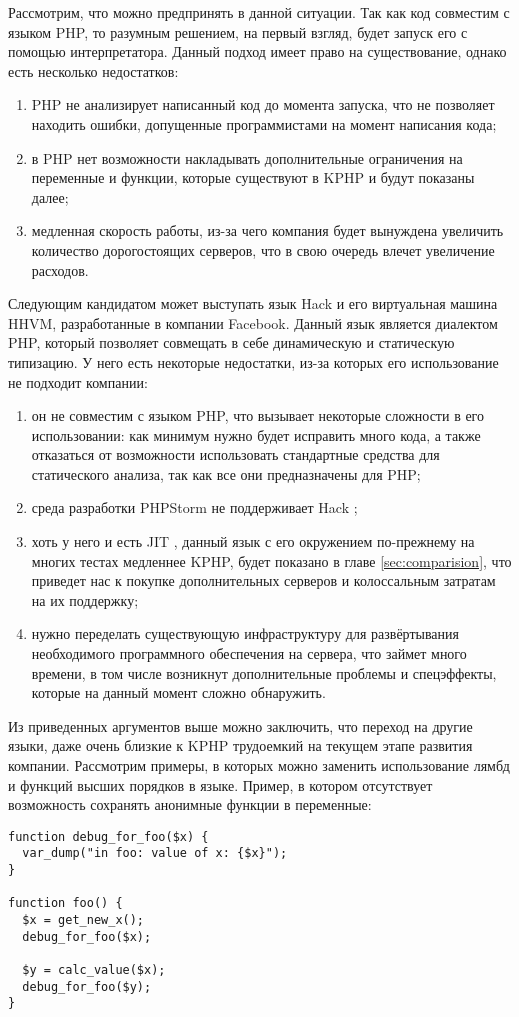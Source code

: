 Рассмотрим, что можно предпринять в данной ситуации. 
Так как код совместим с языком PHP, то разумным решением, на первый взгляд, будет запуск его с помощью интерпретатора.
Данный подход имеет право на существование, однако есть несколько недостатков:
\begin{enumerate}
  \item PHP не анализирует написанный код до момента запуска, что не позволяет находить ошибки, допущенные программистами на момент написания кода;
  \item в PHP нет возможности накладывать дополнительные ограничения на переменные и функции, которые существуют в KPHP и будут показаны далее;
  \item медленная скорость работы, из-за чего компания будет вынуждена увеличить количество дорогостоящих серверов, что в свою очередь влечет увеличение расходов.
\end{enumerate}

Следующим кандидатом может выступать язык Hack и его виртуальная машина HHVM, разработанные в компании Facebook.
Данный язык является диалектом PHP, который позволяет совмещать в себе динамическую и статическую типизацию.
У него есть некоторые недостатки, из-за которых его использование не подходит компании:
\begin{enumerate}
\item он не совместим с языком PHP, что вызывает некоторые сложности в его использовании: как минимум нужно будет исправить много кода, а также отказаться от возможности использовать стандартные средства для статического анализа, так как все они предназначены для PHP;

\item среда разработки PHPStorm не поддерживает Hack \cite{hack-postponed};

\item хоть у него и есть JIT \cite{hack-jit}, данный язык с его окружением по-прежнему на многих тестах медленнее KPHP, будет показано в главе \ref{sec:comparision}, что приведет нас к покупке дополнительных серверов и колоссальным затратам на их поддержку;

\item нужно переделать существующую инфраструктуру для развёртывания необходимого программного обеспечения на сервера, что займет много времени, в том числе возникнут дополнительные проблемы и спецэффекты, которые на данный момент сложно обнаружить.
\end{enumerate}

Из приведенных аргументов выше можно заключить, что переход на другие языки, даже очень близкие к KPHP трудоемкий на текущем этапе развития компании.
Рассмотрим примеры, в которых можно заменить использование лямбд и функций высших порядков в языке.
Пример, в котором отсутствует возможность сохранять анонимные функции в переменные:
\begin{lstlisting}[caption={Пример кода без анонимных функций},label={without_lambda}]
function debug_for_foo($x) {
  var_dump("in foo: value of x: {$x}");
}

function foo() {
  $x = get_new_x();
  debug_for_foo($x);

  $y = calc_value($x);
  debug_for_foo($y);
}
\end{lstlisting}

